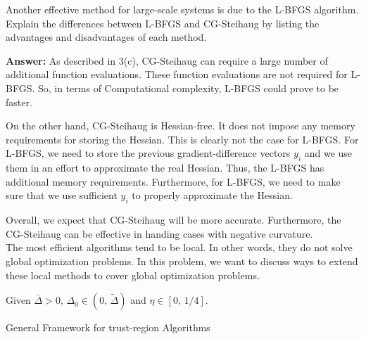 \documentclass[12pt,legalpaper]{article}
\begin{document}
 Another effective method for large-scale systems is due to the L-BFGS algorithm.
  Explain the differences between L-BFGS and CG-Steihaug by listing the advantages and disadvantages
  of each method.

{\bf Answer:} As described in 3(c), CG-Steihaug can require a large number of additional function evaluations. These
function evaluations are not required for L-BFGS. So, in terms of Computational complexity, L-BFGS could prove to be faster.

On the other hand, CG-Steihaug is Hessian-free. It does not impose any memory requirements for storing the Hessian.
This is clearly not the case for L-BFGS. For L-BFGS, we need to store the previous gradient-difference vectors $y_i$ and
we use them in an effort to approximate the real Hessian. Thus, the L-BFGS has additional memory requirements. Furthermore,
for L-BFGS, we need to make sure that we use sufficient $y_i$ to properly approximate the Hessian.

Overall, we expect that CG-Steihaug will be more accurate. Furthermore, the CG-Steihaug can be effective in handing cases with negative curvature.
\newpage
%
\\
The most efficient algorithms tend to be local.
In other words, they do not solve global optimization problems.
In this problem, we want to discuss ways to extend these local methods to cover
    global optimization problems.
\IncMargin{1em}
\LinesNumbered
\begin{algorithm}
  Given
    $\bar{\Delta}>0, \, \Delta_0 \in (0, \, \tilde{\Delta})$
    and $\eta \in [0, \, 1/4]$. \\
%  
\caption{General Framework for trust-region Algorithms}
\end{algorithm}
\DecMargin{1em}
\end{document}
